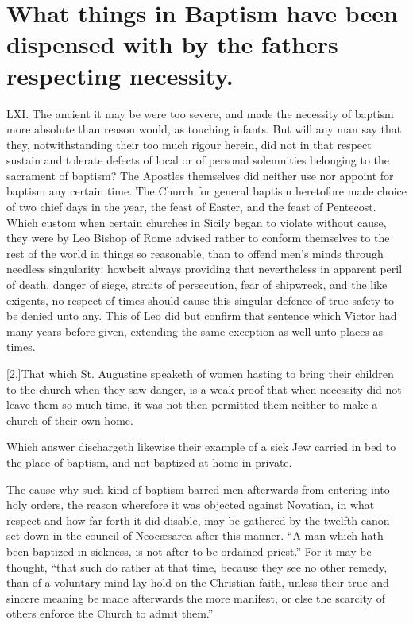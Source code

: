 \section*{What things in Baptism have been dispensed with by the fathers respecting necessity.}
LXI. The ancient it may be were too severe, and made the necessity of baptism more absolute than reason would, as touching  infants. But will any man say that they, notwithstanding their too much rigour herein, did not in that respect sustain and tolerate defects of local or of personal solemnities belonging to the sacrament of baptism? The Apostles themselves did neither use nor appoint for baptism any certain time. The Church for general baptism heretofore made choice of two chief days in the year, the feast of Easter, and the feast of Pentecost. Which custom when certain churches in Sicily began to violate without cause, they were by Leo Bishop of Rome advised rather to conform themselves to the rest of the world in things so reasonable, than to offend men’s minds through needless singularity: howbeit always providing that  nevertheless in apparent peril of death, danger of siege, straits of persecution, fear of shipwreck, and the like exigents, no respect of times should cause this singular defence of true safety to be denied unto any.
 This of Leo did but confirm that sentence which Victor had many years before given, extending the same exception as well unto places as times.

[2.]That which St. Augustine speaketh of women hasting to bring their children to the church when they saw danger, is a weak proof that when necessity did not leave them so much time, it was not then permitted them neither to make a church of their own home.

Which answer dischargeth likewise their example of a sick Jew carried in bed to the place of baptism, and not baptized at home in private.

The cause why such kind of baptism barred men afterwards from entering into holy orders, the reason wherefore it was objected against Novatian, in what respect and how far forth it did disable, may be gathered by the twelfth canon set down in the council of Neocæsarea after this manner. “A man which hath been baptized in sickness, is not after to be ordained priest.” For it may be thought, “that such do rather at that time, because they see no other remedy, than of a voluntary mind lay hold on the Christian faith, unless their true and sincere meaning be made afterwards the more manifest, or else the scarcity of others enforce the Church to admit them.”




